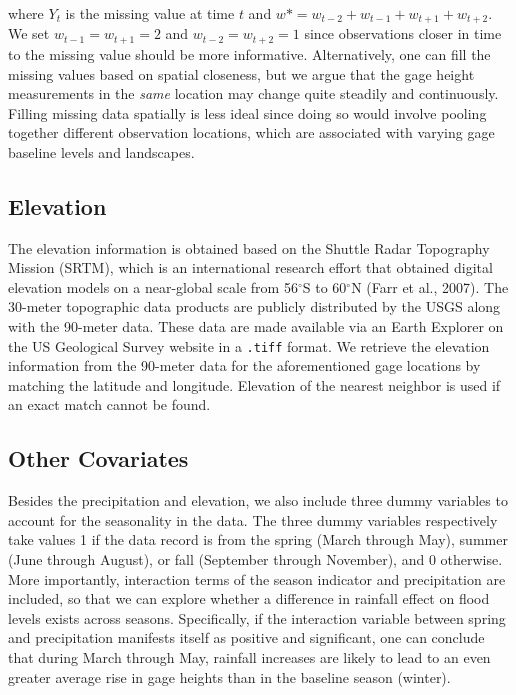 \documentclass{svjour3}
\begin{document}
\noindent where $Y_t$  is the missing value at time $t$ and $ w* =w_{t-2} + w_{t-1}+ w_{t+1} + w_{t+2}$.
We set $ w_{t-1} = w_{t+1} = 2$ and $ w_{t-2} = w_{t+2} = 1$ since  observations closer in time to the missing value should be more informative.
Alternatively, one can fill the missing values based on spatial closeness, but we argue that the gage height measurements in the \emph{same} location may change quite steadily and continuously.
Filling missing data spatially is less ideal since doing so would involve pooling together different observation locations, which are associated with varying gage baseline levels and landscapes.

\subsection{Elevation}\label{subsec:elevation}
The elevation information  is obtained based on the Shuttle Radar Topography Mission (SRTM), which is an international research effort that obtained digital elevation models on a near-global scale from 56$^\circ$S to 60$^\circ$N (Farr et al., 2007).
The 30-meter topographic data products are  publicly distributed by the USGS along with the 90-meter data.
These data are made available via an Earth Explorer on the US Geological Survey website in a \texttt{.tiff} format.
We retrieve the elevation information from the 90-meter data for the aforementioned gage locations by matching the latitude and longitude.
Elevation of the nearest neighbor is used if an exact match cannot be found.

\subsection{Other Covariates}\label{subsec:other-covariates}
Besides the precipitation and elevation, we also include three dummy variables to account for the seasonality in the data.
The three dummy variables respectively take values 1 if the data record is from the spring (March through May), summer (June through August), or fall (September through November), and 0 otherwise.
More importantly, interaction terms of the season indicator and precipitation are included, so that we can explore whether a difference in rainfall effect on flood levels exists across seasons.
Specifically, if the interaction variable between spring and precipitation manifests itself as  positive and significant, one can conclude that during March through May, rainfall increases are likely to lead to an even greater average rise in gage heights than in the baseline season (winter).
\end{document}
